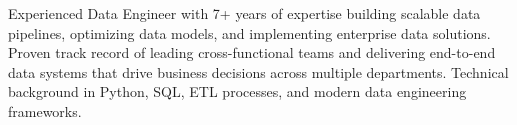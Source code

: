 
\begin{cvparagraph}
Experienced Data Engineer with 7+ years of expertise building scalable data pipelines, optimizing data models, and implementing enterprise data solutions. Proven track record of leading cross-functional teams and delivering end-to-end data systems that drive business decisions across multiple departments. Technical background in Python, SQL, ETL processes, and modern data engineering frameworks.
\end{cvparagraph}
